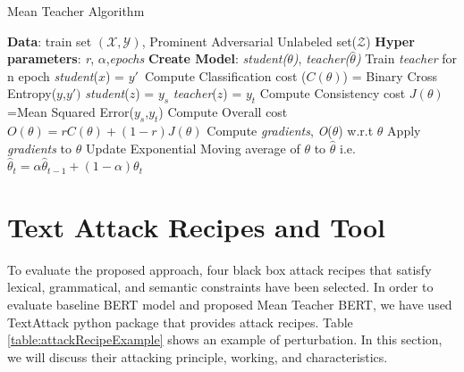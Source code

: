 \documentclass[%
	BCOR=8mm, %
	DIV=12,
	toc=bibliography, %
	toc=listof, %
	oneside, %
	egregdoesnotlikesansseriftitles, %
	]{scrbook}
\begin{document}
\begin{algorithm}[H]
    \caption{Mean Teacher Algorithm} \label{alg:MeanTeacher}
    \begin{algorithmic}
        \STATE \textbf{Data}: train set $\mathcal{(X,Y)}$,  Prominent Adversarial Unlabeled set($\mathcal{Z}$)
        \STATE \textbf{Hyper parameters}: \emph{r}, \emph{$\alpha$},\emph{epochs}
        \STATE \textbf{Create Model}: \emph{student($\theta$)}, \emph{teacher($\hat\theta$)} 
        \STATE  Train \emph{teacher} for n epoch
        \STATE  \emph{student}($x$) = $y'$\
        \STATE Compute Classification cost ($C(\theta)$) = Binary Cross Entropy($y$,$y')$
        \STATE  \emph{student}($z$) = $y_s$
        \STATE  \emph{teacher}($z$) = $y_t$
        \STATE Compute Consistency cost $J(\theta)$=Mean Squared Error($y_s$,$y_{t}$)
        \STATE Compute Overall cost  $\textit{O}(\theta)= r C(\theta)+(1-r)J(\theta)$
        \STATE Compute \emph{gradients}, \textit{O}($\theta$) w.r.t  $\theta$ 
        \STATE Apply \emph{gradients} to $\theta$
        \STATE Update Exponential Moving average of $\theta$ to $\hat\theta$ i.e. $\hat\theta_t= \alpha\hat\theta_{t-1}+(1-\alpha)\theta_t$\
        \ENDWHILE
        \ENDFOR
    \end{algorithmic}
\end{algorithm}

\section{Text Attack Recipes and Tool}
\label{section:attackrecipes}
To evaluate the proposed approach, four black box attack recipes that satisfy lexical, grammatical, and semantic constraints have been selected. In order to evaluate baseline BERT model and proposed Mean Teacher BERT, we have used TextAttack python package\cite{morris_textattack_2020}  that provides attack recipes. Table \ref{table:attackRecipeExample} shows an example of perturbation. In this section, we will discuss their attacking principle, working, and characteristics.
\end{document}
